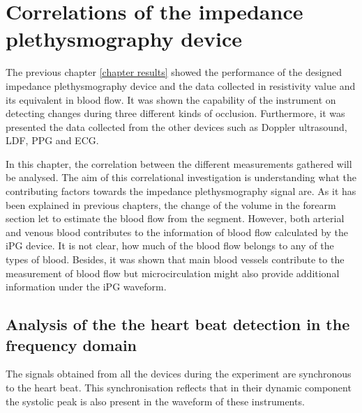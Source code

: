 
\chapter{Correlations of the impedance plethysmography device}  %
\label{chapter correlations}
\ifpdf
    \graphicspath{{Chapter6/Figs/Raster/}{Chapter6/Figs/PDF/}{Chapter6/Figs/}}
\else
    \graphicspath{{Chapter6/Figs/Vector/}{Chapter6/Figs/}}
\fi

The previous chapter \ref{chapter results} showed the performance of the designed impedance plethysmography device and the data collected in resistivity value and its equivalent in blood flow. It was shown the capability of the instrument on detecting changes during three different kinds of occlusion. Furthermore, it was presented the data collected from the other devices such as Doppler ultrasound, LDF, PPG and ECG. 

\nknote{}

In this chapter, the correlation between the different measurements gathered will be analysed. The aim of this correlational investigation is understanding what the contributing factors towards the impedance plethysmography signal are. As it has been explained in previous chapters, the change of the volume in the forearm section let to estimate the blood flow from the segment. However, both arterial and venous blood contributes to the information of blood flow calculated by the iPG device. It is not clear, how much of the blood flow belongs to any of the types of blood. Besides, it was shown that main blood vessels contribute to the measurement of blood flow but microcirculation might also provide additional information under the iPG waveform. 


\section{Analysis of the the heart beat detection in the frequency domain} %
\label{section correlation 1} 
The signals obtained from all the devices during the experiment are synchronous to the heart beat. This synchronisation reflects that in their dynamic component the systolic peak is also present in the waveform of these instruments.

